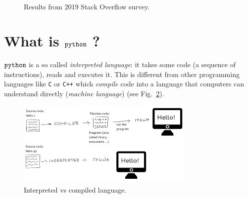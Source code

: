 \begin{figure}[!ht]
	\centering
	\\
	\\
	\caption{Results from 2019 Stack Overflow survey.}
	\label{fig:dummy}
\end{figure}

\section{What is $\tt{python}$ ?}\label{what-is-python}

$\tt{python}$ is a so called \emph{interpreted language}: it takes some code (a sequence of instructions), reads and executes it. This is different from other programming languages like \texttt{C} or \texttt{C++} which \emph{compile} code into a language that computers can understand directly (\emph{machine language}) (see Fig.~\ref{fig:compiled_vs_interpreted}).

\begin{figure}[h]
\centering
\includegraphics[width=0.7\linewidth]{figures/index.png}
\caption{Interpreted vs compiled language.}
\label{fig:compiled_vs_interpreted}
\end{figure}

